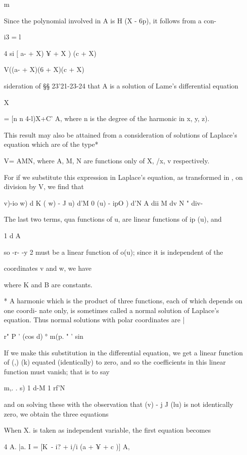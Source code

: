 {{{m

Since the polynomial involved in A is H (X - 6p), it follows from a
con-

i3 = l

4 si [ a- + X) ¥ + X ) (c + X)

V((a- + X)(6 + X)(c + X)

sideration of §§ 23'21-23-24 that A is a solution of Lame's
differential equation

X

= [n n 4-l)X+C' A, where n is the degree of the harmonic in x, y, z).

This result may also be attained from a consideration of solutions of
Laplace's equation which are of the type*

V= AMN, where A, M, N are functions only of X, /x, v respectively.

For if we substitute this expression in Laplace's equation, as
transformed in , on division by V, we find that

  v)-io w) d K ( w) - J u) d'M 0 (u) - ipO ) d'N A dii M dv N " div-

The last two terms, qua functions of u, are linear functions of ip
(u), and

1 d A

so -r- -y 2 must be a linear function of o(u); since it is independent
of the

coordinates v and w, we have

where K and B are constants.

* A harmonic which is the product of three functions, each of which
depends on one coordi- nate only, is sometimes called a normal
solution of Laplace's equation. Thus normal solutions with polar
coordinates are |

r" P ' (cos d) ° m(p. " ' sin

%
%

If we make this substitution in the differential equation, we get a
linear function of (,) (k) equated (identically) to zero, and so the
coefficients in this linear function must vanish; that is to say

m,. . s) 1 d-M 1 rf'N

and on solving these with the observation that (v) - j J (lu) is not
identically zero, we obtain the three equations

When X. is taken as independent variable, the first equation becomes

4 A. |a. I = [K\ - i? + i/i (a + ¥ + c )] A,

}}}
